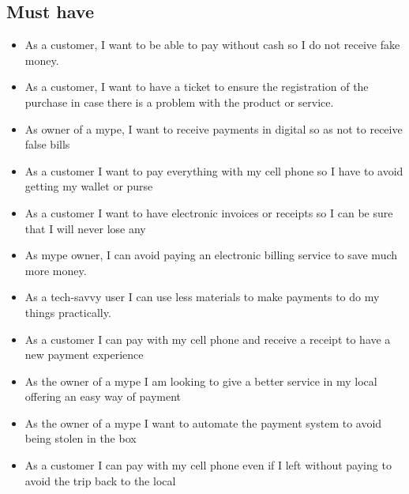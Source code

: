 \documentclass{article}
\begin{document}
\subsection{Must have}
\begin{itemize}
\item As a customer, I want to be able to pay without cash so I do not receive fake money.
\item As a customer, I want to have a ticket to ensure the registration of the purchase in case there is a problem with the product or service.
\item As owner of a mype, I want to receive payments in digital so as not to receive false bills
\item As a customer I want to pay everything with my cell phone so I have to avoid getting my wallet or purse
\item As a customer I want to have electronic invoices or receipts so I can be sure that I will never lose any
\item As mype owner, I can avoid paying an electronic billing service to save much more money.
\item As a tech-savvy user I can use less materials to make payments to do my things practically.
\item As a customer I can pay with my cell phone and receive a receipt to have a new payment experience
\item As the owner of a mype I am looking to give a better service in my local offering an easy way of payment
\item As the owner of a mype I want to automate the payment system to avoid being stolen in the box
\item As a customer I can pay with my cell phone even if I left without paying to avoid the trip back to the local



    
\end{itemize}
\end{document}
